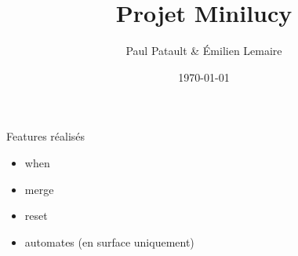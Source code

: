 \documentclass{beamer}
\title{Projet Minilucy}
\date{\today}
\author{Paul Patault \& Émilien Lemaire}
\institute{ENS Paris-Saclay}
\begin{document}
\maketitle


\begin{frame}{Features réalisés}
  \begin{itemize}
    \item when
    \item merge
    \item reset
    \item automates (en surface uniquement)
  \end{itemize}
\end{frame}



\end{document}
